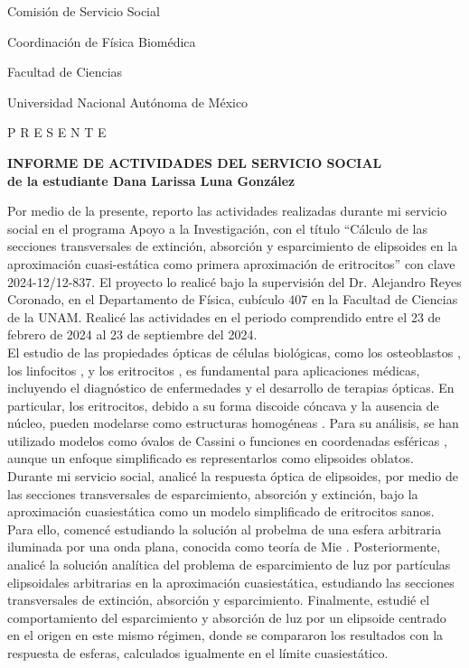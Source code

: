 \documentclass[9pt,letterpaper]{article}
\begin{document}
	Comisión de Servicio Social
	
	Coordinación de Física Biomédica
	
	Facultad de Ciencias
	
	Universidad Nacional Autónoma de México
	
	P R E S E N T E
	
	\vspace{1cm}
	
	\begin{center}
		\textbf{INFORME DE ACTIVIDADES DEL SERVICIO SOCIAL}\\
		\textbf{de la estudiante Dana Larissa Luna González}
	\end{center}
	
Por medio de la presente, reporto las actividades realizadas durante mi servicio social en el programa Apoyo a la Investigación, con el título ``Cálculo de las secciones transversales de extinción, absorción y esparcimiento de elipsoides en la aproximación cuasi-estática como primera aproximación de eritrocitos'' con clave 2024-12/12-837. El proyecto lo realicé bajo la supervisión del Dr. Alejandro Reyes Coronado, en el Departamento de Física, cubículo 407 en la Facultad de Ciencias de la UNAM. Realicé las actividades en el periodo comprendido entre el 23 de febrero de 2024 al 23 de septiembre del 2024. \\

El estudio de las propiedades ópticas de células biológicas, como los osteoblastos \cite{Osteoblastos}, los linfocitos \cite{Linfocitos}, y los eritrocitos \cite{Blood}, es fundamental para aplicaciones médicas, incluyendo el diagnóstico de enfermedades y el desarrollo de terapias ópticas. En particular, los eritrocitos, debido a su forma discoide cóncava y la ausencia de núcleo, pueden modelarse como estructuras homogéneas \cite{Cassini}. Para su análisis, se han utilizado modelos como óvalos de Cassini \cite{Cassini} o funciones en coordenadas esféricas \cite{Esferico}, aunque un enfoque simplificado es representarlos como elipsoides oblatos.\\

 Durante mi servicio social, analicé la respuesta óptica de elipsoides, por medio de las secciones transversales de esparcimiento, absorción y extinción, bajo la aproximación cuasiestática como un modelo simplificado de eritrocitos sanos. Para ello, comencé estudiando la solución al probelma de una esfera arbitraria iluminada por una onda plana, conocida como teoría de Mie \cite{Bohren}. Posteriormente, analicé la solución analítica del problema de esparcimiento de luz por partículas elipsoidales arbitrarias en la aproximación cuasiestática, estudiando las secciones transversales de extinción, absorción y esparcimiento. Finalmente, estudié el comportamiento del esparcimiento y absorción de luz por un elipsoide centrado en el origen en este mismo régimen, donde se compararon los resultados con la respuesta de esferas, calculados igualmente en el límite cuasiestático.\\
 
\end{document}
